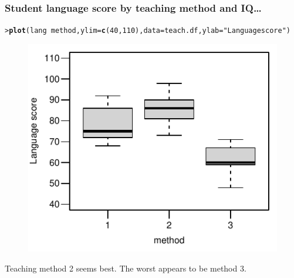\documentclass{beamer}\usepackage[]{graphicx}\usepackage[]{xcolor}
\makeatletter
\newcommand{\hlnum}[1]{\textcolor[rgb]{0.686,0.059,0.569}{#1}}%
\newcommand{\hlstr}[1]{\textcolor[rgb]{0.192,0.494,0.8}{#1}}%
\newcommand{\hlopt}[1]{\textcolor[rgb]{0,0,0}{#1}}%
\newcommand{\hlstd}[1]{\textcolor[rgb]{0.345,0.345,0.345}{#1}}%
\newcommand{\hlkwc}[1]{\textcolor[rgb]{0.333,0.667,0.333}{#1}}%
\newcommand{\hlkwd}[1]{\textcolor[rgb]{0.737,0.353,0.396}{\textbf{#1}}}%
\newenvironment{kframe}{%
 \def\at@end@of@kframe{}%
 \ifinner\ifhmode%
  \def\at@end@of@kframe{\end{minipage}}%
  \begin{minipage}{\columnwidth}%
 \fi\fi%
 \def\FrameCommand##1{\hskip\@totalleftmargin \hskip-\fboxsep
 \colorbox{shadecolor}{##1}\hskip-\fboxsep
     \hskip-\linewidth \hskip-\@totalleftmargin \hskip\columnwidth}%
 \MakeFramed {\advance\hsize-\width
   \@totalleftmargin\z@ \linewidth\hsize
   \@setminipage}}%
 {\par\unskip\endMakeFramed%
 \at@end@of@kframe}
\newenvironment{knitrout}{}{} %
\makeatother
\begin{document}
\begin{frame}[fragile]
\frametitle{Student language score by teaching method and IQ\ldots}
\begin{knitrout}\scriptsize
{}\color{fgcolor}\begin{kframe}
\begin{alltt}
\hlstd{> }\hlkwd{plot}\hlstd{(lang} \hlopt{~} \hlstd{method,} \hlkwc{ylim}\hlstd{=}\hlkwd{c}\hlstd{(}\hlnum{40}\hlstd{,}\hlnum{110}\hlstd{),} \hlkwc{data}\hlstd{=teach.df,} \hlkwc{ylab}\hlstd{=}\hlstr{"Language score"}\hlstd{)}
\end{alltt}
\end{kframe}
\end{knitrout}



\begin{figure}
  \centering
  \includegraphics{figure/RC-H09-005}
\end{figure}

Teaching method 2 seems best. The worst appears to be method 3.

\end{frame}
\end{document}
